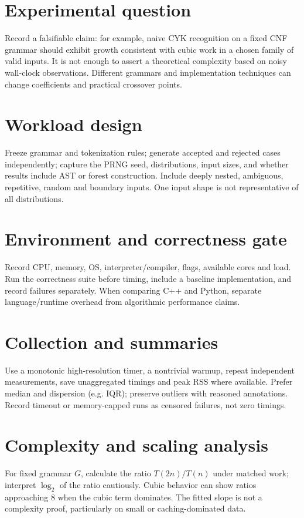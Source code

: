 \documentclass[11pt,letterpaper]{article}
\begin{document}
\makedoctitle\makedocsummary
\tableofcontents\clearpage
\section{Experimental question}
Record a falsifiable claim: for example, naive CYK recognition on a fixed CNF grammar should exhibit growth consistent with cubic work in a chosen family of valid inputs. It is not enough to assert a theoretical complexity based on noisy wall-clock observations. Different grammars and implementation techniques can change coefficients and practical crossover points.
\section{Workload design}
Freeze grammar and tokenization rules; generate accepted and rejected cases independently; capture the PRNG seed, distributions, input sizes, and whether results include AST or forest construction. Include deeply nested, ambiguous, repetitive, random and boundary inputs. One input shape is not representative of all distributions.
\section{Environment and correctness gate}
Record CPU, memory, OS, interpreter/compiler, flags, available cores and load. Run the correctness suite before timing, include a baseline implementation, and record failures separately. When comparing C++ and Python, separate language/runtime overhead from algorithmic performance claims.
\section{Collection and summaries}
Use a monotonic high-resolution timer, a nontrivial warmup, repeat independent measurements, save unaggregated timings and peak RSS where available. Prefer median and dispersion (e.g. IQR); preserve outliers with reasoned annotations. Record timeout or memory-capped runs as censored failures, not zero timings.
\section{Complexity and scaling analysis}
For fixed grammar $G$, calculate the ratio $T(2n)/T(n)$ under matched work; interpret $\log_2$ of the ratio cautiously. Cubic behavior can show ratios approaching 8 when the cubic term dominates. The fitted slope is not a complexity proof, particularly on small or caching-dominated data.
\end{document}
